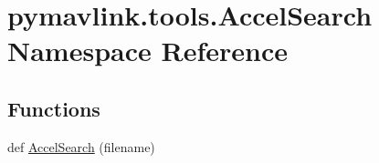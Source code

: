 \hypertarget{namespacepymavlink_1_1tools_1_1AccelSearch}{}\section{pymavlink.\+tools.\+Accel\+Search Namespace Reference}
\label{namespacepymavlink_1_1tools_1_1AccelSearch}
\subsection*{Functions}
\begin{DoxyCompactItemize}
\item 
def \mbox{\hyperlink{namespacepymavlink_1_1tools_1_1AccelSearch_a20e68a37811b32e425149b7751a0180b}{Accel\+Search}} (filename)
\end{DoxyCompactItemize}
